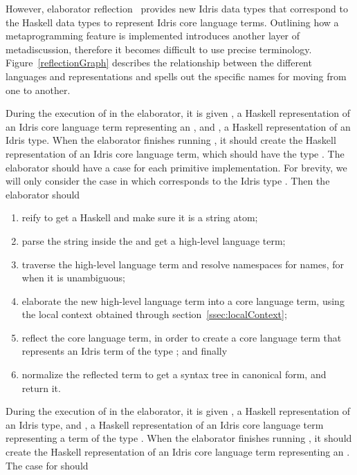 However, elaborator reflection~\citep{davidphd, elabref} provides new Idris
data types that correspond to the Haskell data types to represent Idris core
language terms.
Outlining how a metaprogramming feature is implemented introduces another layer of metadiscussion,
therefore it becomes difficult to use precise terminology.
Figure~\ref{reflectionGraph} describes the relationship between the different
languages and representations and spells out the specific names for moving
from one to another.

During the execution of  in the elaborator, it is given
, a Haskell representation of an Idris core language term representing
an \sexp{}, and , a Haskell representation of an Idris type.
When the elaborator finishes running , it should create
the Haskell representation of an Idris core language term, which should have the
type . The elaborator should have a case for each primitive
\Editorable{} implementation. For brevity, we will only consider the case in
which  corresponds to the Idris type \TT{}. Then the elaborator should

\begin{enumerate}
  \item reify  to get a Haskell \sexp{} and make sure it is a string atom;
  \item parse the string inside the \sexp{} and get a high-level language term;
  \item traverse the high-level language term and resolve namespaces for names, for when it is unambiguous;
  \item elaborate the new high-level language term into a core language term, using the local context obtained through section~\ref{ssec:localContext};
  \item reflect the core language term, in order to create a core language term that represents an Idris term of the type \TT{}; and finally
  \item normalize the reflected term to get a syntax tree in canonical form, and return it.
\end{enumerate}

During the execution of  in the elaborator, it is given
, a Haskell representation of an Idris type, and ,
a Haskell representation of an Idris core language term representing
a term of the type .
When the elaborator finishes running , it should create
the Haskell representation of an Idris core language term representing an
\sexp{}. The \TT{} case for  should


